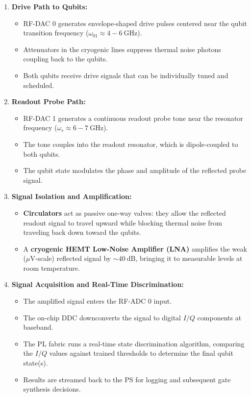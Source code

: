 \documentclass[
]{article}
\providecommand{\tightlist}{%
  \setlength{\itemsep}{0pt}\setlength{\parskip}{0pt}}
\begin{document}
\begin{enumerate}
\def\labelenumi{\arabic{enumi}.}
\tightlist
\item
  \textbf{Drive Path to Qubits:}

  \begin{itemize}
  \tightlist
  \item
    RF-DAC 0 generates envelope-shaped drive pulses centered near the
    qubit transition frequency
    (\(\omega_{01} \approx 4-6\ \text{GHz}\)).
  \item
    Attenuators in the cryogenic lines suppress thermal noise photons
    coupling back to the qubits.
  \item
    Both qubits receive drive signals that can be individually tuned and
    scheduled.
  \end{itemize}
\item
  \textbf{Readout Probe Path:}

  \begin{itemize}
  \tightlist
  \item
    RF-DAC 1 generates a continuous readout probe tone near the
    resonator frequency (\(\omega_r \approx 6-7\ \text{GHz}\)).
  \item
    The tone couples into the readout resonator, which is dipole-coupled
    to both qubits.
  \item
    The qubit state modulates the phase and amplitude of the reflected
    probe signal.
  \end{itemize}
\item
  \textbf{Signal Isolation and Amplification:}

  \begin{itemize}
  \tightlist
  \item
    \textbf{Circulators} act as passive one-way valves: they allow the
    reflected readout signal to travel upward while blocking thermal
    noise from traveling back down toward the qubits.
  \item
    A \textbf{cryogenic HEMT Low-Noise Amplifier (LNA)} amplifies the
    weak (\(\mu\text{V}\)-scale) reflected signal by
    \(\sim 40\ \text{dB}\), bringing it to measurable levels at room
    temperature.
  \end{itemize}
\item
  \textbf{Signal Acquisition and Real-Time Discrimination:}

  \begin{itemize}
  \tightlist
  \item
    The amplified signal enters the RF-ADC 0 input.
  \item
    The on-chip DDC downconverts the signal to digital \(I/Q\)
    components at baseband.
  \item
    The PL fabric runs a real-time state discrimination algorithm,
    comparing the \(I/Q\) values against trained thresholds to determine
    the final qubit state(s).
  \item
    Results are streamed back to the PS for logging and subsequent gate
    synthesis decisions.
  \end{itemize}
\end{enumerate}
\end{document}
